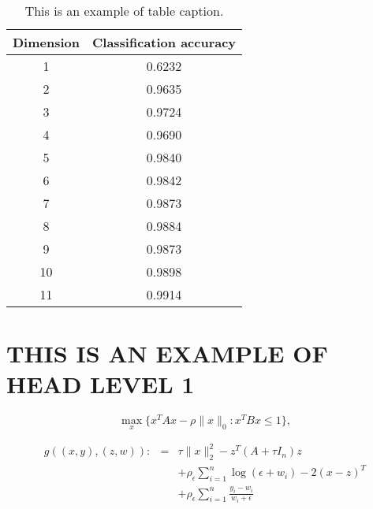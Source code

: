 \documentclass{pasa}%
\begin{document}
\begin{table}
\caption{This is an example of table caption.}
\begin{center}
\begin{tabular}{@{}cc@{}}
\hline\hline
Dimension & Classification accuracy \\
\hline%
 1  & 0.6232 \\
 2  & 0.9635 \\ 
 3  & 0.9724 \\ 
 4  & 0.9690 \\ 
 5  & 0.9840 \\ 
 6  & 0.9842 \\ 
 7  & 0.9873 \\ 
 8  & 0.9884 \\
 9  & 0.9873 \\ 
 10 & 0.9898 \\ 
 11 & 0.9914 \\
\hline\hline
\end{tabular}
\end{center}
\label{tab1}
\end{table}

 
\section{THIS IS AN EXAMPLE OF HEAD LEVEL 1}


\begin{equation}\label{GEV}
\max\limits_{x}\{x^TAx-\rho \|x\|_0: x^TBx\leq 1\},
\end{equation}


\begin{eqnarray*}
	g((x,y),(z,w)):&=&\tau\|x\|_2^2-z^T(A+\tau I_n)z\\
	&&+\rho_\epsilon\sum\limits_{i=1}^n\log(\epsilon+w_i)-2(x-z)^T\\
	&&+\rho_\epsilon\sum\limits_{i=1}^n\frac{y_i-w_i}{w_i+\epsilon}
\end{eqnarray*}
\end{document}
